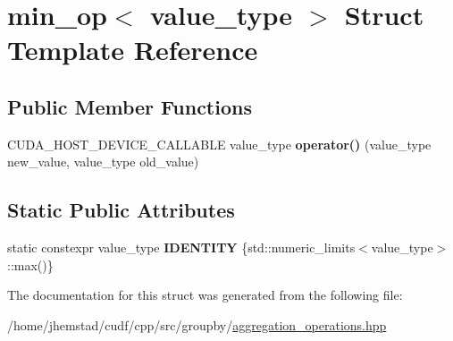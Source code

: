 \hypertarget{structmin__op}{}\section{min\+\_\+op$<$ value\+\_\+type $>$ Struct Template Reference}
\label{structmin__op}
\subsection*{Public Member Functions}
\begin{DoxyCompactItemize}
\item 
C\+U\+D\+A\+\_\+\+H\+O\+S\+T\+\_\+\+D\+E\+V\+I\+C\+E\+\_\+\+C\+A\+L\+L\+A\+B\+LE value\+\_\+type {\bfseries operator()} (value\+\_\+type new\+\_\+value, value\+\_\+type old\+\_\+value)\hypertarget{structmin__op_a86c2d22ac3e90efc3efbc86b8d29febb}{}\label{structmin__op_a86c2d22ac3e90efc3efbc86b8d29febb}

\end{DoxyCompactItemize}
\subsection*{Static Public Attributes}
\begin{DoxyCompactItemize}
\item 
static constexpr value\+\_\+type {\bfseries I\+D\+E\+N\+T\+I\+TY} \{std\+::numeric\+\_\+limits$<$value\+\_\+type$>$\+::max()\}\hypertarget{structmin__op_ad39a443976277c5dcc54b30961a384da}{}\label{structmin__op_ad39a443976277c5dcc54b30961a384da}

\end{DoxyCompactItemize}


The documentation for this struct was generated from the following file\+:\begin{DoxyCompactItemize}
\item 
/home/jhemstad/cudf/cpp/src/groupby/\hyperlink{aggregation__operations_8hpp}{aggregation\+\_\+operations.\+hpp}\end{DoxyCompactItemize}
